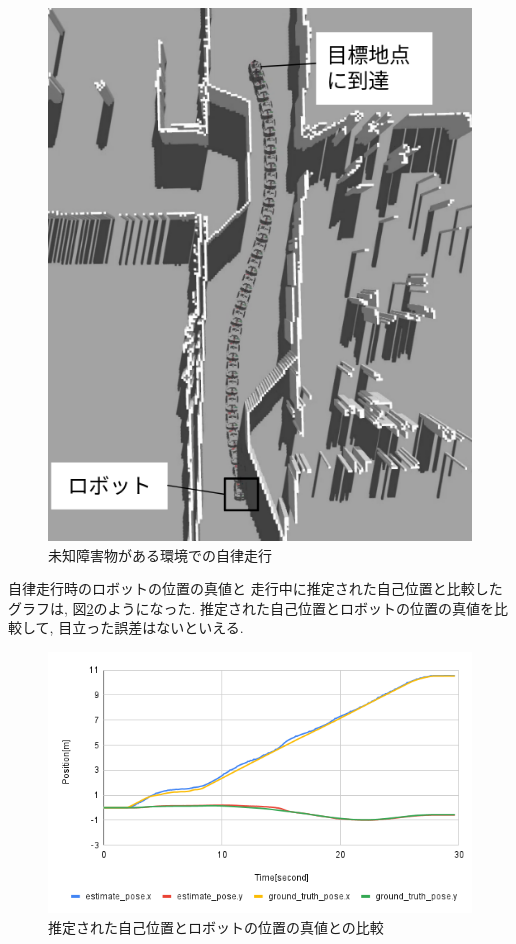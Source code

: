 \begin{figure}[H]
  \begin{center}
    \includegraphics[width=0.5\linewidth]{figs/no_implementation_no_reset.png}
    \caption{未知障害物がある環境での自律走行}
    \label{fig:nav_imp}
  \end{center}
\end{figure}

自律走行時のロボットの位置の真値と
走行中に推定された自己位置と比較したグラフは, 図\ref{fig:odom_comp_imp}のようになった. 
推定された自己位置とロボットの位置の真値を比較して, 目立った誤差はないといえる. 

\begin{figure}[H]
  \begin{center}
    \includegraphics[width=0.98\linewidth]{figs/sim_imp_ground_truth.png}
    \caption{推定された自己位置とロボットの位置の真値との比較}
    \label{fig:odom_comp_imp}
  \end{center}
\end{figure}

